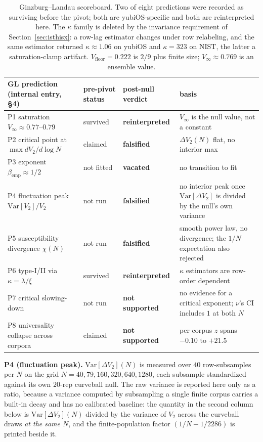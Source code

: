 \documentclass[11pt,a4paper]{article}
\theoremstyle{plain}
\theoremstyle{remark}
\theoremstyle{plain}
\begin{document}
\begin{table}[h]
\centering
\small
\begin{tabular}{llll}
\toprule
GL prediction (internal entry, \S4) & pre-pivot status & post-null verdict & basis \\
\midrule
P1 saturation $V_\infty\approx0.77$--$0.79$ & survived & \textbf{reinterpreted} & $V_\infty$ is the null value, not a constant \\
P2 critical point at $\max dV_2/d\log N$ & claimed & \textbf{falsified} & $\Delta V_2(N)$ flat, no interior max \\
P3 exponent $\beta_{\mathrm{emp}}\approx1/2$ & not fitted & \textbf{vacated} & no transition to fit \\
P4 fluctuation peak $\mathrm{Var}[V_2]/V_2$ & not run & \textbf{falsified} & no interior peak once $\mathrm{Var}[\Delta V_2]$ is divided by the null's own variance \\
P5 susceptibility divergence $\chi(N)$ & not run & \textbf{falsified} & smooth power law, no divergence; the $1/N$ expectation also rejected \\
P6 type-I/II via $\kappa=\lambda/\xi$ & survived & \textbf{reinterpreted} & $\kappa$ estimators are row-order dependent \\
P7 critical slowing-down & not run & \textbf{not supported} & no evidence for a critical exponent; $\nu$'s CI includes $1$ at both $N$ \\
P8 universality collapse across corpora & claimed & \textbf{not supported} & per-corpus $z$ spans $-0.10$ to $+21.5$ \\
\bottomrule
\end{tabular}
\caption{Ginzburg--Landau scoreboard. Two of eight predictions were recorded as surviving before the pivot; both are yubiOS-specific and both are reinterpreted here. The $\kappa$ family is deleted by the invariance requirement of Section~\ref{sec:isthisx}: a row-lag estimator changes under row relabeling, and the same estimator returned $\kappa\approx1.06$ on yubiOS and $\kappa=323$ on NIST, the latter a saturation-clamp artifact. $V_{\mathrm{floor}}=0.222$ is $2/9$ plus finite size; $V_\infty\approx0.769$ is an ensemble value.}
\label{tab:glscoreboard}
\end{table}


\textbf{P4 (fluctuation peak).} $\mathrm{Var}[\Delta V_2](N)$ is measured over
$40$ row-subsamples per $N$ on the grid $N=40,79,160,320,640,1280$, each
subsample standardized against its own $20$-rep curveball null. The raw variance
is reported here only as a ratio, because a variance computed by subsampling a
single finite corpus carries a built-in decay and has no calibrated baseline: the
quantity in the second column below is
$\mathrm{Var}[\Delta V_2](N)$ divided by the variance of $V_2$ across the
curveball draws \emph{at the same $N$}, and the finite-population factor
$(1/N-1/2286)$ is printed beside it.
\end{document}
